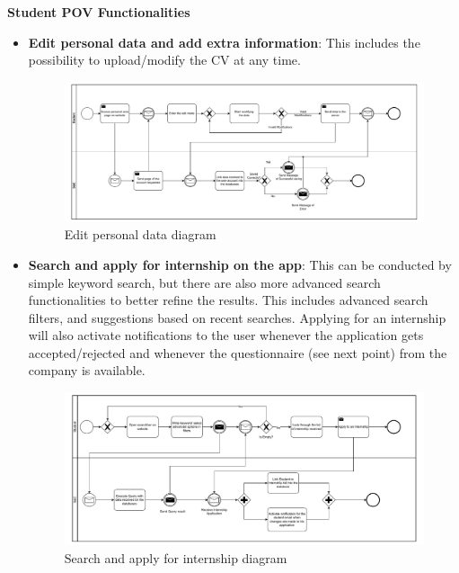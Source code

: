 \par\textbf{Student POV Functionalities}

\begin{itemize}
      \item \textbf{Edit personal data and add extra information}: This includes the possibility to upload/modify the
            CV at any time.

            \begin{figure}[H]
                  \centering
                  \includegraphics[width=1.0\textwidth]{Images/BPMN_3.pdf}
                  \caption{Edit personal data diagram}
                  \label{fig:edit_personal_data_diagram}
            \end{figure}

      \item \textbf{Search and apply for internship on the app}: This can be conducted by simple keyword search, but
            there are also more advanced search functionalities to better refine the results. This includes advanced
            search filters, and suggestions based on recent searches. Applying for an internship will also activate
            notifications to the user whenever the application gets accepted/rejected and whenever the questionnaire
            (see next point) from the company is available.

            \begin{figure}[H]
                  \centering
                  \includegraphics[width=1.0\textwidth]{Images/BPMN_4.pdf}
                  \caption{Search and apply for internship diagram}
                  \label{fig:search_and_apply_for_internship_diagram}
            \end{figure}


\end{itemize}
